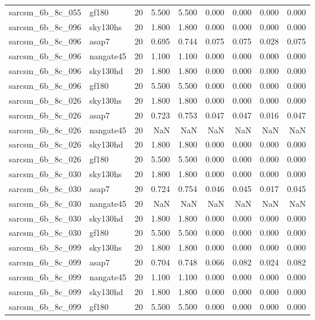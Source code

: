 \begin{tabular}{llrrrrrrr}
sarcsm\_6b\_8c\_055 & gf180 & 20 & 5.500 & 5.500 & 0.000 & 0.000 & 0.000 & 0.000 \\
sarcsm\_6b\_8c\_096 & sky130hs & 20 & 1.800 & 1.800 & 0.000 & 0.000 & 0.000 & 0.000 \\
sarcsm\_6b\_8c\_096 & asap7 & 20 & 0.695 & 0.744 & 0.075 & 0.075 & 0.028 & 0.075 \\
sarcsm\_6b\_8c\_096 & nangate45 & 20 & 1.100 & 1.100 & 0.000 & 0.000 & 0.000 & 0.000 \\
sarcsm\_6b\_8c\_096 & sky130hd & 20 & 1.800 & 1.800 & 0.000 & 0.000 & 0.000 & 0.000 \\
sarcsm\_6b\_8c\_096 & gf180 & 20 & 5.500 & 5.500 & 0.000 & 0.000 & 0.000 & 0.000 \\
sarcsm\_6b\_8c\_026 & sky130hs & 20 & 1.800 & 1.800 & 0.000 & 0.000 & 0.000 & 0.000 \\
sarcsm\_6b\_8c\_026 & asap7 & 20 & 0.723 & 0.753 & 0.047 & 0.047 & 0.016 & 0.047 \\
sarcsm\_6b\_8c\_026 & nangate45 & 20 & NaN & NaN & NaN & NaN & NaN & NaN \\
sarcsm\_6b\_8c\_026 & sky130hd & 20 & 1.800 & 1.800 & 0.000 & 0.000 & 0.000 & 0.000 \\
sarcsm\_6b\_8c\_026 & gf180 & 20 & 5.500 & 5.500 & 0.000 & 0.000 & 0.000 & 0.000 \\
sarcsm\_6b\_8c\_030 & sky130hs & 20 & 1.800 & 1.800 & 0.000 & 0.000 & 0.000 & 0.000 \\
sarcsm\_6b\_8c\_030 & asap7 & 20 & 0.724 & 0.754 & 0.046 & 0.045 & 0.017 & 0.045 \\
sarcsm\_6b\_8c\_030 & nangate45 & 20 & NaN & NaN & NaN & NaN & NaN & NaN \\
sarcsm\_6b\_8c\_030 & sky130hd & 20 & 1.800 & 1.800 & 0.000 & 0.000 & 0.000 & 0.000 \\
sarcsm\_6b\_8c\_030 & gf180 & 20 & 5.500 & 5.500 & 0.000 & 0.000 & 0.000 & 0.000 \\
sarcsm\_6b\_8c\_099 & sky130hs & 20 & 1.800 & 1.800 & 0.000 & 0.000 & 0.000 & 0.000 \\
sarcsm\_6b\_8c\_099 & asap7 & 20 & 0.704 & 0.748 & 0.066 & 0.082 & 0.024 & 0.082 \\
sarcsm\_6b\_8c\_099 & nangate45 & 20 & 1.100 & 1.100 & 0.000 & 0.000 & 0.000 & 0.000 \\
sarcsm\_6b\_8c\_099 & sky130hd & 20 & 1.800 & 1.800 & 0.000 & 0.000 & 0.000 & 0.000 \\
sarcsm\_6b\_8c\_099 & gf180 & 20 & 5.500 & 5.500 & 0.000 & 0.000 & 0.000 & 0.000 \\

\end{tabular}
